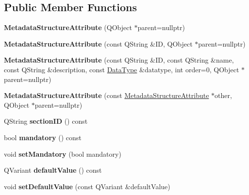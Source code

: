 \subsection*{Public Member Functions}
\begin{DoxyCompactItemize}
\item 
\mbox{\label{class_metadata_structure_attribute_a23420530c101e502e544aa8c29ae8769}} 
{\bfseries Metadata\+Structure\+Attribute} (Q\+Object $\ast$parent=nullptr)
\item 
\mbox{\label{class_metadata_structure_attribute_a71b232d2ed96c7c0a9e06e4116d497b4}} 
{\bfseries Metadata\+Structure\+Attribute} (const Q\+String \&ID, Q\+Object $\ast$parent=nullptr)
\item 
\mbox{\label{class_metadata_structure_attribute_a2eb0c30dca32ae4544273f391a021a10}} 
{\bfseries Metadata\+Structure\+Attribute} (const Q\+String \&ID, const Q\+String \&name, const Q\+String \&description, const \hyperlink{class_data_type}{Data\+Type} \&datatype, int order=0, Q\+Object $\ast$parent=nullptr)
\item 
\mbox{\label{class_metadata_structure_attribute_aee20bfcde03c5f6575475ae34893431a}} 
{\bfseries Metadata\+Structure\+Attribute} (const \hyperlink{class_metadata_structure_attribute}{Metadata\+Structure\+Attribute} $\ast$other, Q\+Object $\ast$parent=nullptr)
\item 
\mbox{\label{class_metadata_structure_attribute_a6d60dccc40a99fd62ebf57aae5ef1f1b}} 
Q\+String {\bfseries section\+ID} () const
\item 
\mbox{\label{class_metadata_structure_attribute_ab18197c06bb5c61936d1943124512824}} 
bool {\bfseries mandatory} () const
\item 
\mbox{\label{class_metadata_structure_attribute_abe72fb93181e4dc9997afc3e322cc668}} 
void {\bfseries set\+Mandatory} (bool mandatory)
\item 
\mbox{\label{class_metadata_structure_attribute_a0c9d65d45942aec5413a39facbc314c9}} 
Q\+Variant {\bfseries default\+Value} () const
\item 
\mbox{\label{class_metadata_structure_attribute_a006d062945ab84606e7e915073cf2b9f}} 
void {\bfseries set\+Default\+Value} (const Q\+Variant \&default\+Value)
\end{DoxyCompactItemize}
